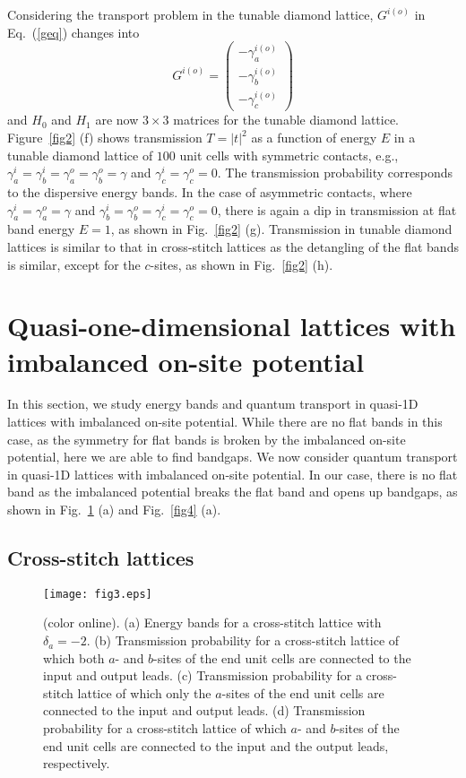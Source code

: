 \documentclass[twocolumn,showpacs,epsfig,pre]{revtex4}
\newcommand{\figsizeone}{0.48}
\begin{document}
Considering the transport problem in the tunable diamond lattice, $G^{i(o)}$ in Eq.~(\ref{geq}) changes into 
\begin{equation}
G^{i(o)} = \left(\begin{array}{c}
 -\gamma_a^{i(o)} \\
 -\gamma_b^{i(o)} \\
 -\gamma_c^{i(o)}
\end{array}\right)
\end{equation}
and $H_0$ and $H_1$ are now $3 \times 3$ matrices for the tunable diamond lattice.
Figure~\ref{fig2} (f) shows transmission $T=\left|t\right|^2$ as a function of energy $E$ in a tunable diamond lattice of $100$ unit cells with symmetric contacts, e.g., $\gamma_a^{i}=\gamma_b^{i}=\gamma_a^{o}=\gamma_b^{o}=\gamma$ and $\gamma_c^{i}=\gamma_c^{o}=0$. The transmission probability corresponds to the dispersive energy bands.
In the case of asymmetric contacts, where $\gamma_a^{i} = \gamma_a^{o} = \gamma$ and $\gamma_b^{i}=\gamma_b^{o}=\gamma_c^{i}=\gamma_c^{o}=0$, there is again a dip in transmission at flat band energy $E=1$, as shown in Fig.~\ref{fig2} (g). Transmission in tunable diamond lattices is similar to that in cross-stitch lattices as the detangling of the flat bands is similar, except for the $c$-sites, as shown in Fig.~\ref{fig2} (h).

\section{Quasi-one-dimensional lattices with imbalanced on-site potential}

In this section, we study energy bands and quantum transport in quasi-1D lattices with imbalanced on-site potential.
While there are no flat bands in this case, as the symmetry for flat bands is broken by the imbalanced on-site potential, here we are able to find bandgaps.
We now consider quantum transport in quasi-1D lattices with imbalanced on-site potential. In our case, there is no flat band as the imbalanced potential breaks the flat band and opens up bandgaps, as shown in Fig.~\ref{fig3} (a) and Fig.~\ref{fig4} (a).

\subsection{Cross-stitch lattices}

\begin{figure}
\begin{center}
\texttt{[image: fig3.eps]}
\caption{(color online).
(a) Energy bands for a cross-stitch lattice with $\delta_a = -2$.
(b) Transmission probability for a cross-stitch lattice of which both $a$- and $b$-sites of the end unit cells are connected to the input and output leads.
(c) Transmission probability for a cross-stitch lattice of which only the $a$-sites of the end unit cells are connected to the input and output leads.
(d) Transmission probability for a cross-stitch lattice of which $a$- and $b$-sites of the end unit cells are connected to the input and the output leads, respectively.
}
\label{fig3}
\end{center}
\end{figure}
\end{document}

